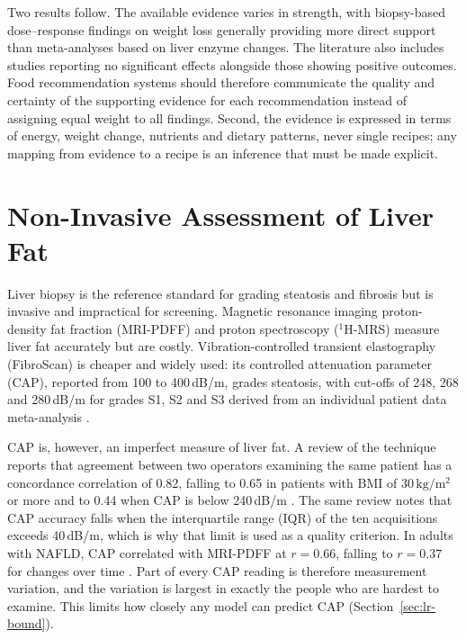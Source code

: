 Two results follow. The available evidence varies in strength, with biopsy-based dose--response findings on weight loss generally providing more direct support than meta-analyses based on liver enzyme changes. The literature also includes studies reporting no significant effects alongside those showing positive outcomes. Food recommendation systems should therefore communicate the quality and certainty of the supporting evidence for each recommendation instead of assigning equal weight to all findings. Second, the evidence is expressed in terms of energy, weight change, nutrients and dietary patterns, never single recipes; any mapping from evidence to a recipe is an inference that must be made explicit.

\section{Non-Invasive Assessment of Liver Fat}
\label{sec:lr-noninv}

Liver biopsy is the reference standard for grading steatosis and fibrosis but is invasive and impractical for screening. Magnetic resonance imaging proton-density fat fraction (MRI-PDFF) and proton spectroscopy ($^{1}$H-MRS) measure liver fat accurately but are costly. Vibration-controlled transient elastography (FibroScan) is cheaper and widely used: its controlled attenuation parameter (CAP), reported from 100 to 400\,dB/m, grades steatosis, with cut-offs of 248, 268 and 280\,dB/m for grades S1, S2 and S3 derived from an individual patient data meta-analysis \cite{karlas2017cap}.

CAP is, however, an imperfect measure of liver fat. A review of the technique reports that agreement between two operators examining the same patient has a concordance correlation of 0.82, falling to 0.65 in patients with BMI of $30\,\mathrm{kg/m^2}$ or more and to 0.44 when CAP is below 240\,dB/m \cite{ferraioli2021cap}. The same review notes that CAP accuracy falls when the interquartile range (IQR) of the ten acquisitions exceeds 40\,dB/m, which is why that limit is used as a quality criterion. In adults with NAFLD, CAP correlated with MRI-PDFF at $r = 0.66$, falling to $r = 0.37$ for changes over time \cite{ahn2018cap}. Part of every CAP reading is therefore measurement variation, and the variation is largest in exactly the people who are hardest to examine. This limits how closely any model can predict CAP (Section~\ref{sec:lr-bound}).

